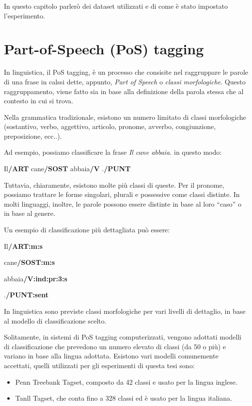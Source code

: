 In questo capitolo parler\`o dei dataset utilizzati e di come \`e stato impostato l'esperimento.

\section{Part-of-Speech (PoS) tagging}
In linguistica, il PoS tagging, \`e un processo che consisite nel raggruppare le parole di una frase in calssi dette, appunto, \emph{Part of Speech} o \emph{classi morfologiche}.
Questo raggruppamento, viene fatto sia in base alla definizione della parola stessa che al contesto in cui si trova.

Nella grammatica tradizionale, esistono un numero limitato di classi morfologiche (sostantivo, verbo, aggettivo, articolo, pronome, avverbo, congiunzione, preposizione, ecc..).

Ad esempio, possiamo classificare la frase \emph{Il cane abbaia.} in questo modo:

\centerline{Il\textbf{/ART} cane\textbf{/SOST} abbaia\textbf{/V} .\textbf{/PUNT}}

Tuttavia, chiaramente, esistono molte pi\`u classi di queste.
Per il pronome, possiamo trattare le forme singolari, plurali e possessive come classi distinte.
In molti linguaggi, inoltre, le parole possono essere distinte in base al loro ``caso'' o in base al genere.

Un esempio di classificazione pi\`u dettagliata pu\`o essere:

\begin{center}
Il\textbf{/ART:m:s}

cane\textbf{/SOST:m:s}

abbaia\textbf{/V:ind:pr:3:s}

.\textbf{/PUNT:sent}
\end{center}

In linguistica sono previste classi morfologiche per vari livelli di dettaglio, in base al modello di classificazione scelto.

Solitamente, in sistemi di PoS tagging computerizzati, vengono adottati modelli di classificazione che prevedono un numero elevato di classi (da 50 o pi\`u) e variano in base alla lingua adottata.
Esistono vari modelli comunemente accettati, quelli utilizzati per gli esperimenti di questa tesi sono:
\begin{itemize}
  \item Penn Treebank Tagset, composto da 42 classi e usato per la lingua inglese.
  \item Tanll Tagset, che conta fino a 328 classi ed \`e usato per la lingua italiana.
\end{itemize}

